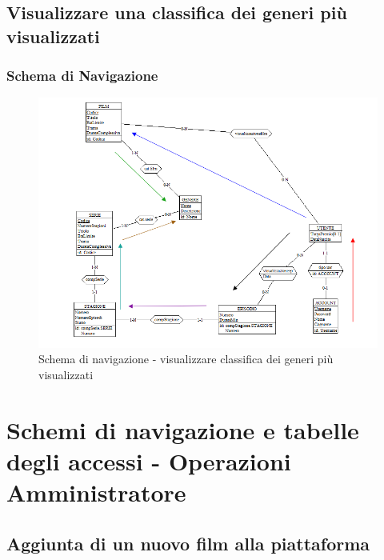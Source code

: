 \documentclass[a4paper,12pt]{report}
\begin{document}
	
	\subsection{Visualizzare una classifica dei generi più visualizzati}
	\subsubsection{Schema di Navigazione}
	\begin{figure}[H]
		\centering
		\includegraphics[width=450pt]{ER/navigazione/classificageneri.png}
		\caption{Schema di navigazione - visualizzare classifica dei generi più visualizzati}
	\end{figure}	
	
	\section{Schemi di navigazione e tabelle degli accessi - Operazioni Amministratore}
	
	
	\subsection{Aggiunta di un nuovo film alla piattaforma}
\end{document}

